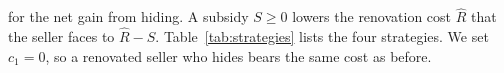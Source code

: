 for the net gain from hiding. A subsidy $S\ge0$ lowers the renovation cost $\hat R$ that the seller faces to $\hat R-S$. Table~\ref{tab:strategies} lists the four strategies. We set $c_1=0$, so a renovated seller who hides bears the same cost as before.
